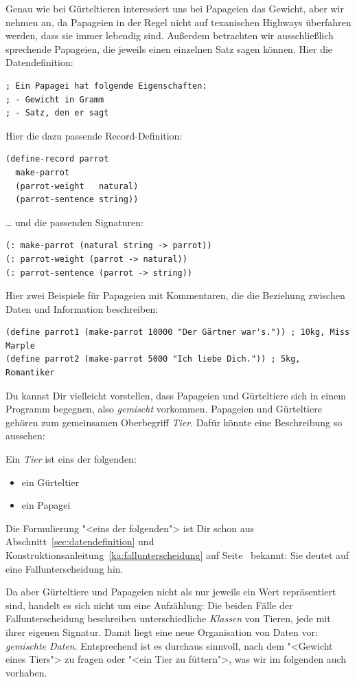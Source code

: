 Genau wie bei Gürteltieren interessiert uns bei Papageien das Gewicht,
aber wir nehmen an, da Papageien in der Regel nicht auf texanischen
Highways überfahren werden, dass sie immer lebendig sind.  Außerdem
betrachten wir ausschließlich sprechende Papageien, die jeweils einen
einzelnen Satz sagen können.  Hier die Datendefinition:
%
\begin{lstlisting}
; Ein Papagei hat folgende Eigenschaften:
; - Gewicht in Gramm
; - Satz, den er sagt
\end{lstlisting}
%
Hier die dazu passende Record-Definition:
%
\begin{lstlisting}
(define-record parrot
  make-parrot
  (parrot-weight   natural)
  (parrot-sentence string))
\end{lstlisting}
%
\ldots{} und die passenden Signaturen:
%
\begin{lstlisting}
(: make-parrot (natural string -> parrot))
(: parrot-weight (parrot -> natural))
(: parrot-sentence (parrot -> string))
\end{lstlisting}
%
Hier zwei Beispiele für Papageien mit Kommentaren, die die Beziehung
zwischen Daten und Information beschreiben:
%
\begin{lstlisting}
(define parrot1 (make-parrot 10000 "Der Gärtner war's.")) ; 10kg, Miss Marple
(define parrot2 (make-parrot 5000 "Ich liebe Dich.")) ; 5kg, Romantiker 
\end{lstlisting}
%
Du kannst Dir vielleicht vorstellen, dass Papageien und
Gürteltiere sich in einem Programm begegnen, also \emph{gemischt}
vorkommen.  Papageien und Gürteltiere gehören zum gemeinsamen
Oberbegriff \textit{Tier}.  Dafür könnte eine
Beschreibung so aussehen:

\medskip

\noindent Ein \textit{Tier} ist eins der folgenden:
% 
\begin{itemize}
\item ein Gürteltier
\item ein Papagei
\end{itemize}
%
Die Formulierung "<eins der folgenden"> ist Dir schon aus
Abschnitt~\ref{sec:datendefinition} und
Konstruktionsanleitung~\ref{ka:fallunterscheidung} auf
Seite~\pageref{ka:fallunterscheidung} bekannt: Sie deutet auf eine
Fallunterscheidung hin.

Da aber Gürteltiere und Papageien nicht als nur jeweils ein Wert
repräsentiert sind, handelt es sich nicht um eine Aufzählung: Die
beiden Fälle der Fallunterscheidung beschreiben unterschiedliche
\textit{Klassen} von Tieren, jede mit ihrer eigenen
Signatur.  Damit liegt eine neue Organisation von Daten vor:
\textit{gemischte Daten}. Entsprechend ist es
durchaus sinnvoll, nach dem "<Gewicht eines Tiers"> zu fragen oder
"<ein Tier zu füttern">, was wir im folgenden auch vorhaben.

